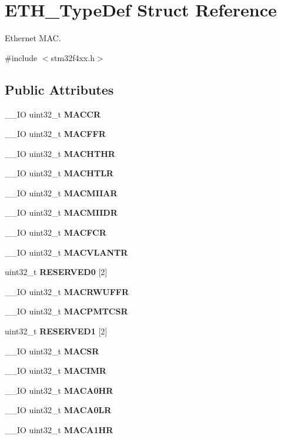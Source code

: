\section{E\+T\+H\+\_\+\+Type\+Def Struct Reference}
\label{structETH__TypeDef}


Ethernet M\+AC.  




{\ttfamily \#include $<$stm32f4xx.\+h$>$}

\subsection*{Public Attributes}
\begin{DoxyCompactItemize}
\item 
\+\_\+\+\_\+\+IO uint32\+\_\+t \textbf{ M\+A\+C\+CR}
\item 
\+\_\+\+\_\+\+IO uint32\+\_\+t \textbf{ M\+A\+C\+F\+FR}
\item 
\+\_\+\+\_\+\+IO uint32\+\_\+t \textbf{ M\+A\+C\+H\+T\+HR}
\item 
\+\_\+\+\_\+\+IO uint32\+\_\+t \textbf{ M\+A\+C\+H\+T\+LR}
\item 
\+\_\+\+\_\+\+IO uint32\+\_\+t \textbf{ M\+A\+C\+M\+I\+I\+AR}
\item 
\+\_\+\+\_\+\+IO uint32\+\_\+t \textbf{ M\+A\+C\+M\+I\+I\+DR}
\item 
\+\_\+\+\_\+\+IO uint32\+\_\+t \textbf{ M\+A\+C\+F\+CR}
\item 
\+\_\+\+\_\+\+IO uint32\+\_\+t \textbf{ M\+A\+C\+V\+L\+A\+N\+TR}
\item 
uint32\+\_\+t \textbf{ R\+E\+S\+E\+R\+V\+E\+D0} [2]
\item 
\+\_\+\+\_\+\+IO uint32\+\_\+t \textbf{ M\+A\+C\+R\+W\+U\+F\+FR}
\item 
\+\_\+\+\_\+\+IO uint32\+\_\+t \textbf{ M\+A\+C\+P\+M\+T\+C\+SR}
\item 
uint32\+\_\+t \textbf{ R\+E\+S\+E\+R\+V\+E\+D1} [2]
\item 
\+\_\+\+\_\+\+IO uint32\+\_\+t \textbf{ M\+A\+C\+SR}
\item 
\+\_\+\+\_\+\+IO uint32\+\_\+t \textbf{ M\+A\+C\+I\+MR}
\item 
\+\_\+\+\_\+\+IO uint32\+\_\+t \textbf{ M\+A\+C\+A0\+HR}
\item 
\+\_\+\+\_\+\+IO uint32\+\_\+t \textbf{ M\+A\+C\+A0\+LR}
\item 
\+\_\+\+\_\+\+IO uint32\+\_\+t \textbf{ M\+A\+C\+A1\+HR}
\item 

\end{DoxyCompactItemize}

